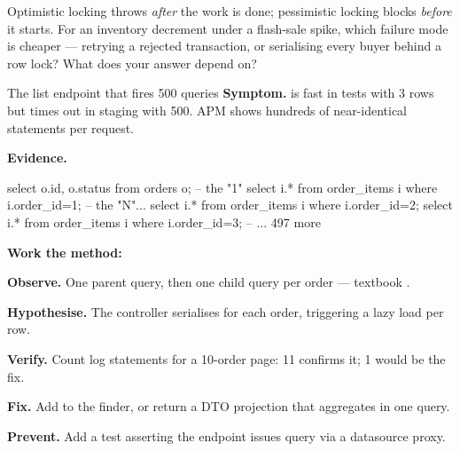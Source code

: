 \begin{thinkbox}
Optimistic locking throws \emph{after} the work is done; pessimistic locking blocks \emph{before} it starts. For an inventory decrement under a flash-sale spike, which failure mode is cheaper --- retrying a rejected transaction, or serialising every buyer behind a row lock? What does your answer depend on?
\end{thinkbox}


\begin{debuglab}{The list endpoint that fires 500 queries}
\textbf{Symptom.}  is fast in tests with 3 rows but times out in staging with 500. APM shows hundreds of near-identical  statements per request.

\smallskip\textbf{Evidence.}
\begin{sqlbox}
select o.id, o.status from orders o;              -- the "1"
select i.* from order_items i where i.order_id=1; -- the "N"...
select i.* from order_items i where i.order_id=2;
select i.* from order_items i where i.order_id=3;
-- ... 497 more
\end{sqlbox}

\textbf{Work the method:}
\begin{tickcheck}
  \item \textbf{Observe.} One parent query, then one child query per order --- textbook .
  \item \textbf{Hypothesise.} The controller serialises  for each order, triggering a lazy load per row.
  \item \textbf{Verify.} Count log statements for a 10-order page: 11 confirms it; 1 would be the fix.
  \item \textbf{Fix.} Add  to the finder, or return a DTO projection that aggregates in one query.
  \item \textbf{Prevent.} Add a test asserting the endpoint issues  query via a datasource proxy.
\end{tickcheck}
\end{debuglab}

